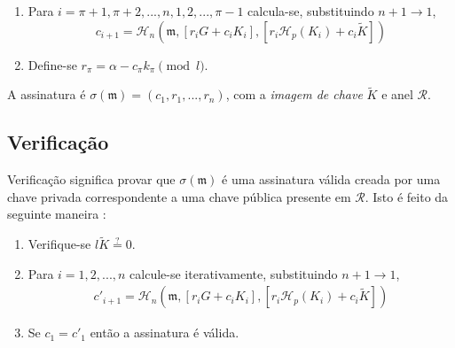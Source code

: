 \begin{description}
\begin{enumerate}
	\item Para \(i = \pi+1, \pi+2, ..., n, 1, 2, ..., \pi-1\) calcula-se, substituindo \(n + 1 \rightarrow 1\),\vspace{.175cm}
	\[c_{i+1} = \mathcal{H}_n(\mathfrak{m}, [r_i G + c_i K_i], [r_i \mathcal{H}_p(K_i) + c_i \tilde{K}])\]

	\item Define-se \(r_\pi = \alpha - c_\pi k_\pi \pmod l\).
\end{enumerate}

A assinatura é \(\sigma(\mathfrak{m}) = (c_1, r_1, ..., r_n)\), com a {\em imagem de chave} $\tilde{K}$ e anel $\mathcal{R}$.


\subsection*{Verificação}

Verificação significa provar que $\sigma(\mathfrak{m})$ é uma assinatura válida creada por uma chave privada correspondente a uma chave pública presente em $\mathcal{R}$. Isto é feito da seguinte maneira : 

\begin{enumerate}
    \item Verifique-se $l \tilde{K} \stackrel{?}{=} 0$.
	\item Para \(i = 1, 2, ..., n\) calcule-se iterativamente, substituindo \(n + 1 \rightarrow 1\),\vspace{.175cm}
	\begin{align*}
	c'_{i+1} = \mathcal{H}_n(\mathfrak{m}, [r_i G + c_i {K_i}], [r_i \mathcal{H}_p(K_i) + c_i \tilde{K}])
	\end{align*}

	\item Se \(c_1 = c'_1\) então a assinatura é válida.
\end{enumerate}


\end{description}
